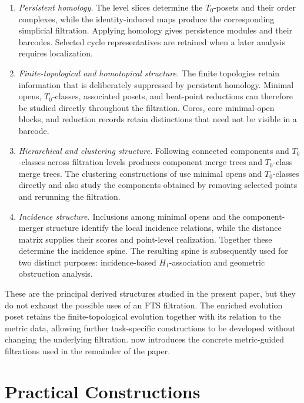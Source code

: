 \documentclass[a4paper,11pt]{article}
\theoremstyle{definition}
\theoremstyle{remark}
\begin{document}
\begin{enumerate}
\item \emph{Persistent homology.} The level slices determine the $T_0$-posets and their order complexes, while the identity-induced maps produce the corresponding simplicial filtration. Applying homology gives persistence modules and their barcodes. Selected cycle representatives are retained when a later analysis requires localization.

\item \emph{Finite-topological and homotopical structure.} The finite topologies retain information that is deliberately suppressed by persistent homology. Minimal opens, $T_0$-classes, associated posets, and beat-point reductions can therefore be studied directly throughout the filtration. Cores, core minimal-open blocks, and reduction records retain distinctions that need not be visible in a barcode.

\item \emph{Hierarchical and clustering structure.} Following connected components and $T_0$-classes across filtration levels produces component merge trees and $T_0$-class merge trees. The clustering constructions of  use minimal opens and $T_0$-classes directly and also study the components obtained by removing selected points and rerunning the filtration.

\item \emph{Incidence structure.} Inclusions among minimal opens and the component-merger structure identify the local incidence relations, while the distance matrix supplies their scores and point-level realization. Together these determine the incidence spine. The resulting spine is subsequently used for two distinct purposes: incidence-based $H_1$-association and geometric obstruction analysis.
\end{enumerate}

These are the principal derived structures studied in the present paper, but they do not exhaust the possible uses of an FTS filtration. The enriched evolution poset retains the finite-topological evolution together with its relation to the metric data, allowing further task-specific constructions to be developed without changing the underlying filtration.  now introduces the concrete metric-guided filtrations used in the remainder of the paper.


\section{Practical Constructions}
\label{sec:practical-constructions}
\end{document}
